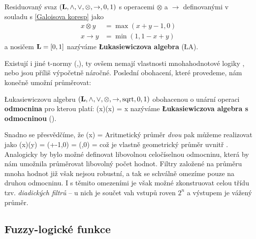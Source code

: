     \begin{define}\label{LA}
    Residuovaný svaz $(\mathbf{L},\wedge,\vee,\otimes,\rightarrow,0,1)$ s operacemi $\otimes$ a $\rightarrow$ definovanými v souladu s \eqref{Galoisova koresp} jako
    \begin{align}
    x \otimes y &= \max(x+y-1,0) \\
    x \rightarrow y &= \min(1,1-x+y)
    \end{align}
    a nosičem $\mathbf{L} = [0,1]$ nazýváme \textbf{\L ukasiewiczova algebra} \textup{(\L A)}.
    \end{define}


    Existují i jiné t-normy (\cite{MajerovaPhD},\cite{Bělíček}), ty ovšem nemají vlastnosti mnohahodnotové logiky \cite{MajerovaPhD}, nebo jsou příliš výpočetně náročné. Poslední obohacení, které provedeme, nám konečně umožní průměrovat:

    \begin{define}\label{LAsqrt}
    \L ukasiewiczovu algebru $(\mathbf{L},\wedge,\vee,\otimes,\rightarrow,\mathrm{sqrt},0,1)$ obohacenou o unární operaci \textbf{odmocnina} pro kterou platí:
    \beq
    \sqr(x)\otimes\sqr(x) = x
    \eeq
    nazýváme \textbf{\L ukasiewiczova algebra s odmocninou} \textup{(\LAsq)}.
    \end{define}

    Snadno se přesvědčíme, že
    \beq
    \sqr(x) = 
    \eeq
    Aritmetický průměr \emph{dvou} pak můžeme realizovat jako
    \beq
    \sqr(x)\otimes \sqr(y) = \max\left(+-1,0\right) = \max\left(,0\right) = 
    \eeq
    což je vlastně geometrický průměr uvnitř \LAsq. Analogicky by bylo možné definovat libovolnou celočíselnou odmocninu, která by nám umožnila průměrovat libovolný počet hodnot. Filtry založené na průměru mnoha hodnot již však nejsou robustní, a tak se schválně omezíme pouze na druhou odmocninu. I s těmito omezeními je však možné zkonstruovat celou třídu tzv. \emph{diadických filtrů} -- u nich je součet vah vstupů roven $2^n$ a výstupem je vážený průměr. 

    \subsection{Fuzzy-logické funkce}

